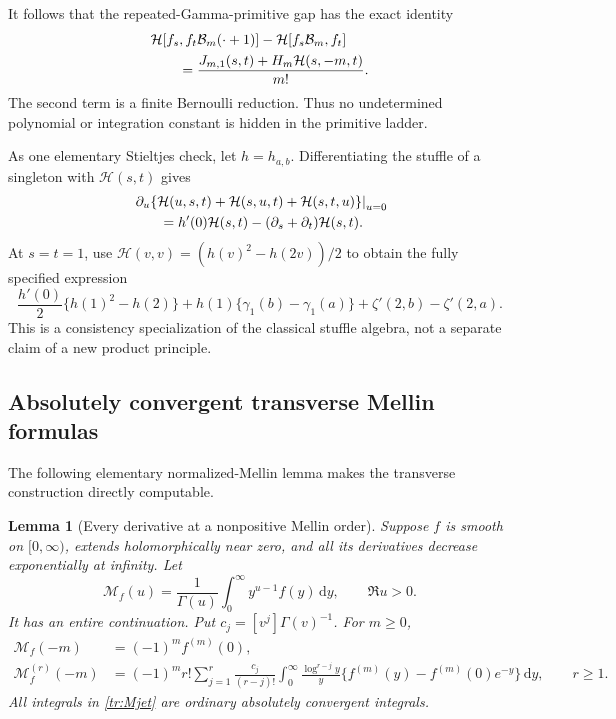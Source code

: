 \documentclass[11pt,letterpaper]{article}
\numberwithin{equation}{section}
\theoremstyle{plain}
\newtheorem{lemma}[theorem]{Lemma}
\theoremstyle{definition}
\theoremstyle{remark}
\newcommand{\dd}{\,\mathrm d}
\newcommand{\HH}{\mathcal H}
\begin{document}
It follows that the repeated-Gamma-primitive gap has the exact identity
\begin{align}
 &\HH[f_s,f_t\mathcal B_m(\cdot+1)]
                 -\HH[f_s\mathcal B_m,f_t]\notag\\
 &\qquad=\frac{J_{m,1}(s,t)+H_m\HH(s,-m,t)}{m!}.
 \label{tr:balancedgap}
\end{align}
The second term is a finite Bernoulli reduction. Thus no undetermined
polynomial or integration constant is hidden in the primitive ladder.

As one elementary Stieltjes check, let $h=h_{a,b}$. Differentiating the
stuffle of a singleton with $\HH(s,t)$ gives
\begin{align}
 &\left.\partial_u\{\HH(u,s,t)+\HH(s,u,t)+\HH(s,t,u)\}\right|_{u=0}
 \notag\\
 &\qquad=h'(0)\HH(s,t)-(\partial_s+\partial_t)\HH(s,t).
 \label{tr:insertionderivative}
\end{align}
At $s=t=1$, use $\HH(v,v)=(h(v)^2-h(2v))/2$ to obtain the fully
specified expression
\begin{equation}\label{tr:Stieltjesexample}
 \frac{h'(0)}2\{h(1)^2-h(2)\}
   +h(1)\{\gamma_1(b)-\gamma_1(a)\}
   +\zeta'(2,b)-\zeta'(2,a).
\end{equation}
This is a consistency specialization of the classical stuffle algebra,
not a separate claim of a new product principle.

\subsection{Absolutely convergent transverse Mellin formulas}

The following elementary normalized-Mellin lemma makes the transverse
construction directly computable.

\begin{lemma}[Every derivative at a nonpositive Mellin order]
\label{tr:Mellinlemma}
Suppose $f$ is smooth on $[0,\infty)$, extends holomorphically near zero,
and all its derivatives decrease exponentially at infinity. Let
\[
 \mathcal M_f(u)=\frac1{\Gamma(u)}
                  \int_0^\infty y^{u-1}f(y)\dd y,\qquad\Re u>0.
\]
It has an entire continuation. Put $c_j=[v^j]\Gamma(v)^{-1}$.
For $m\geq0$,
\begin{align}
 \mathcal M_f(-m)&=(-1)^m f^{(m)}(0),\label{tr:Mvalue}\\
 \mathcal M_f^{(r)}(-m)
 &=(-1)^m r!\sum_{j=1}^r\frac{c_j}{(r-j)!}
      \int_0^\infty\frac{\log^{r-j}y}{y}
          \{f^{(m)}(y)-f^{(m)}(0)e^{-y}\}\dd y ,
 \qquad r\geq1.
 \label{tr:Mjet}
\end{align}
All integrals in \eqref{tr:Mjet} are ordinary absolutely convergent
integrals.
\end{lemma}
\end{document}
